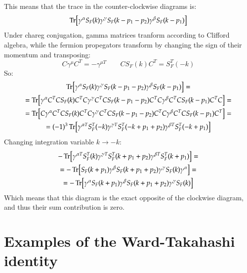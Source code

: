 \documentclass{article}
\begin{document}
This means that the trace in the counter-clockwise diagrams is:
\begin{equation}
    \Tr[
        \gamma^\alpha S_F(k)
        \gamma^\gamma S_F(k - p_1 - p_2)
        \gamma^\beta S_F(k - p_1)
    ]
\end{equation}
Under chareg conjugation, gamma matrices tranform according to Clifford algebra, while the fermion propegators transform by changing the sign of their momentum and transposing:
\begin{equation}
    C \gamma^{\mu} C^T = -\gamma^{\mu T}
    \qquad
    C S_F(k) C^T = S_F^T(-k)
\end{equation}
So:
\begin{equation}
\begin{gathered}
    \Tr[
        \gamma^\alpha S_F(k) \gamma^\gamma S_F(k - p_1 - p_2) \gamma^\beta S_F(k - p_1)
    ] = \\ =
    \Tr[
        \gamma^\alpha C^T C S_F(k) C^T C \gamma^\gamma C^T C S_F(k - p_1 - p_2) C^T C \gamma^\beta C^T C S_F(k - p_1) C^T C 
    ] = \\ =
    \Tr[
        C \gamma^\alpha C^T C S_F(k) C^T C \gamma^\gamma C^T C S_F(k - p_1 - p_2) C^T C \gamma^\beta C^T C S_F(k - p_1) C^T
    ] = \\ =
    (-1)^3\Tr[
        \gamma^{\alpha T} S_F^T(-k) \gamma^{\gamma T} S_F^T(- k + p_1 + p_2) \gamma^{\beta T} S_F^T(- k + p_1)
    ]
\end{gathered}
\end{equation}
Changing integration variable $k \rightarrow -k$:
\begin{equation}
\begin{gathered}
    -\Tr[
        \gamma^{\alpha T} S_F^T(k) \gamma^{\gamma T} S_F^T(k + p_1 + p_2) \gamma^{\beta T} S_F^T(k + p_1)
    ] = \\ =
    -\Tr[
        S_F(k + p_1)
        \gamma^{\beta}
        S_F(k + p_1 + p_2)
        \gamma^{\gamma}
        S_F(k)
        \gamma^{\alpha}
    ] = \\ =
    -\Tr[
        \gamma^{\alpha}
        S_F(k + p_1)
        \gamma^{\beta}
        S_F(k + p_1 + p_2)
        \gamma^{\gamma}
        S_F(k)
    ]
\end{gathered}
\end{equation}
Which means that this diagram is the exact opposite of the clockwise diagram, and thus their sum contribution is zero.
\newpage
\section{Examples of the Ward-Takahashi identity}
\end{document}
